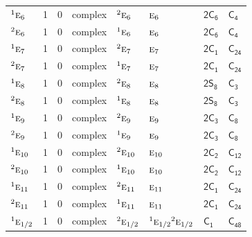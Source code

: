 \documentclass[10pt,a4paper]{article}
\makeatletter
\def\grouprule#1#2{\noalign{\marks\LTgroupmarks{\the\belowrulesep}\nobreak\vskip#1%
  \vskip\aboverulesep}\multispan\LT@cols\unskip{\leaders\hrule\@height#2\hfill\kern\z@}\cr
  \noalign{\penalty\LTrulebreak\vskip\belowrulesep\global\@lastruleclass\z@}}
\numberwithin{equation}{section}
\newcommand{\grp}[1]{\mathsf{#1}}
\newcommand{\irr}[1]{\text{\normalfont\scshape #1}}
\newcommand{\conjpair}[1]{{}^{#1}}
\makeatother
\begin{document}
{\begin{longtable}{@{}lrrlllll@{}}
$\conjpair{1}\irr{e}_{6}$ & 1 & $0$ & complex & $\conjpair{2}\irr{e}_{6}$ & $\irr{e}_{6}$ & \href{2C6.pdf}{$\grp{2C_{6}}$} & \href{../../../rotation/data/pdf/C4.pdf}{$\grp{C_{4}}$}\\
$\conjpair{2}\irr{e}_{6}$ & 1 & $0$ & complex & $\conjpair{1}\irr{e}_{6}$ & $\irr{e}_{6}$ & \href{2C6.pdf}{$\grp{2C_{6}}$} & \href{../../../rotation/data/pdf/C4.pdf}{$\grp{C_{4}}$}\\
$\conjpair{1}\irr{e}_{7}$ & 1 & $0$ & complex & $\conjpair{2}\irr{e}_{7}$ & $\irr{e}_{7}$ & \href{2C1.pdf}{$\grp{2C_{1}}$} & $\grp{C_{24}}$\\
$\conjpair{2}\irr{e}_{7}$ & 1 & $0$ & complex & $\conjpair{1}\irr{e}_{7}$ & $\irr{e}_{7}$ & \href{2C1.pdf}{$\grp{2C_{1}}$} & $\grp{C_{24}}$\\
$\conjpair{1}\irr{e}_{8}$ & 1 & $0$ & complex & $\conjpair{2}\irr{e}_{8}$ & $\irr{e}_{8}$ & \href{2S8.pdf}{$\grp{2S_{8}}$} & \href{../../../rotation/data/pdf/C3.pdf}{$\grp{C_{3}}$}\\
$\conjpair{2}\irr{e}_{8}$ & 1 & $0$ & complex & $\conjpair{1}\irr{e}_{8}$ & $\irr{e}_{8}$ & \href{2S8.pdf}{$\grp{2S_{8}}$} & \href{../../../rotation/data/pdf/C3.pdf}{$\grp{C_{3}}$}\\
$\conjpair{1}\irr{e}_{9}$ & 1 & $0$ & complex & $\conjpair{2}\irr{e}_{9}$ & $\irr{e}_{9}$ & \href{2C3.pdf}{$\grp{2C_{3}}$} & \href{../../../rotation/data/pdf/C8.pdf}{$\grp{C_{8}}$}\\
$\conjpair{2}\irr{e}_{9}$ & 1 & $0$ & complex & $\conjpair{1}\irr{e}_{9}$ & $\irr{e}_{9}$ & \href{2C3.pdf}{$\grp{2C_{3}}$} & \href{../../../rotation/data/pdf/C8.pdf}{$\grp{C_{8}}$}\\
$\conjpair{1}\irr{e}_{10}$ & 1 & $0$ & complex & $\conjpair{2}\irr{e}_{10}$ & $\irr{e}_{10}$ & \href{2C2.pdf}{$\grp{2C_{2}}$} & \href{../../../rotation/data/pdf/C12.pdf}{$\grp{C_{12}}$}\\
$\conjpair{2}\irr{e}_{10}$ & 1 & $0$ & complex & $\conjpair{1}\irr{e}_{10}$ & $\irr{e}_{10}$ & \href{2C2.pdf}{$\grp{2C_{2}}$} & \href{../../../rotation/data/pdf/C12.pdf}{$\grp{C_{12}}$}\\
$\conjpair{1}\irr{e}_{11}$ & 1 & $0$ & complex & $\conjpair{2}\irr{e}_{11}$ & $\irr{e}_{11}$ & \href{2C1.pdf}{$\grp{2C_{1}}$} & $\grp{C_{24}}$\\
$\conjpair{2}\irr{e}_{11}$ & 1 & $0$ & complex & $\conjpair{1}\irr{e}_{11}$ & $\irr{e}_{11}$ & \href{2C1.pdf}{$\grp{2C_{1}}$} & $\grp{C_{24}}$\\
\grouprule{0pt}{\lightrulewidth}
$\conjpair{1}\irr{e}_{1/2}$ & 1 & $0$ & complex & $\conjpair{2}\irr{e}_{1/2}$ & $\conjpair{1}\irr{e}_{1/2}\conjpair{2}\irr{e}_{1/2}$ & \href{C1.pdf}{$\grp{C_{1}}$} & $\grp{C_{48}}$\\

\end{longtable}}
\end{document}
